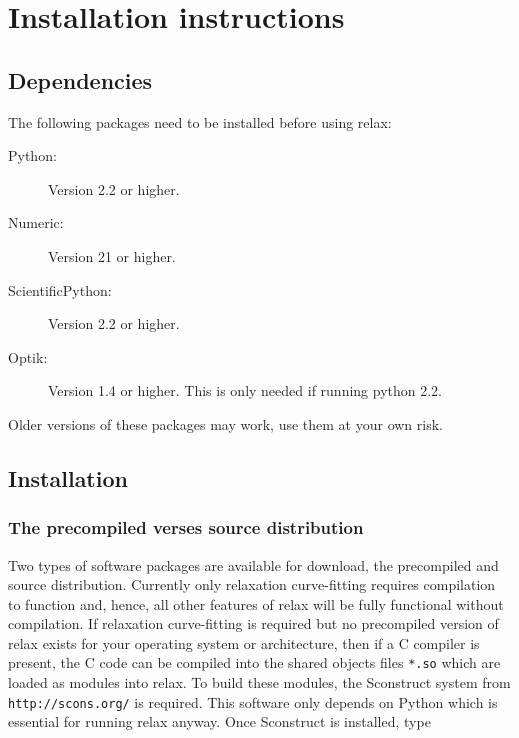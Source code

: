 
\chapter{Installation instructions}



\section{Dependencies}

The following packages need to be installed before using relax:

\begin{description}
\item[Python:]  Version 2.2 or higher.
\item[Numeric:]  Version 21 or higher.
\item[ScientificPython:]  Version 2.2 or higher.
\item[Optik:]  Version 1.4 or higher.  This is only needed if running python 2.2.
\end{description}

Older versions of these packages may work, use them at your own risk.




\section{Installation}


\subsection{The precompiled verses source distribution}

Two types of software packages are available for download, the precompiled and source distribution.  Currently only relaxation curve-fitting requires compilation to function and, hence, all other features of relax will be fully functional without compilation.  If relaxation curve-fitting is required but no precompiled version of relax exists for your operating system or architecture, then if a C compiler is present, the C code can be compiled into the shared objects files \texttt{*.so} which are loaded as modules into relax.  To build these modules, the Sconstruct system from \texttt{http://scons.org/} is required.  This software only depends on Python which is essential for running relax anyway.  Once Sconstruct is installed, type


